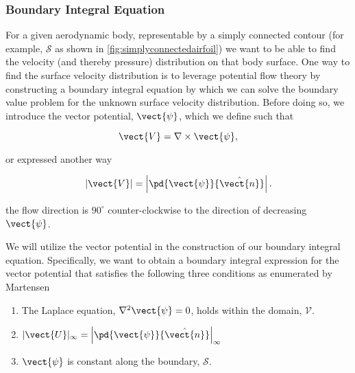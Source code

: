 
\subsubsection{Boundary Integral Equation}

For a given aerodynamic body, representable by a simply connected contour (for example, \(\mathcal{S}\) as shown in \cref{fig:simplyconnectedairfoil}) we want to be able to find the velocity (and thereby pressure) distribution on that body surface.
%
One way to find the surface velocity distribution is to leverage potential flow theory by constructing a boundary integral equation by which we can solve the boundary value problem for the unknown surface velocity distribution.
%
Before doing so, we introduce the vector potential, \(\vect{\psi}\), which we define such that

\begin{equation}
    \label{eqn:generalstream}
    \vect{V} = \nabla \times \vect{\psi},
\end{equation}

\noindent or expressed another way

\begin{equation}
    \label{eqn:generalstream2}
    \left|\vect{V}\right| = \left|\pd{\vect{\psi}}{\hat{\vect{n}}}\right|.
\end{equation}

\where the flow direction is \(90^\circ\) counter-clockwise to the direction of decreasing \(\vect{\psi}\).

We will utilize the vector potential in the construction of our boundary integral equation.
%
Specifically, we want to obtain a boundary integral expression for the vector potential that satisfies the following three conditions as enumerated by Martensen

\begin{enumerate}
\item The Laplace equation, \(\nabla^2 \vect{\psi} = 0\), holds within the domain, \(\mathcal{V}\).
    \item \(|\vect{U}|_\infty = \left|\pd{\vect{\psi}}{\hat{\vect{n}}}\right|_\infty\)
    \item \(\vect{\psi}\) is constant along the boundary, \(\mathcal{S}\).
\end{enumerate}

